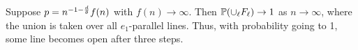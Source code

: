 %
%
%
\begin{theorem} \label{bicuspid}
Suppose $p = n^{-1-\frac{d}{\theta}}f(n)$ with $f(n) \to \infty$. Then $\mathbb{P}(\cup_\ell F_\ell)\to 1$ as $n \to \infty$, where the union is taken over all $e_1$-parallel lines. Thus, with probability going to 1, some line becomes open after three steps.
\end{theorem}

